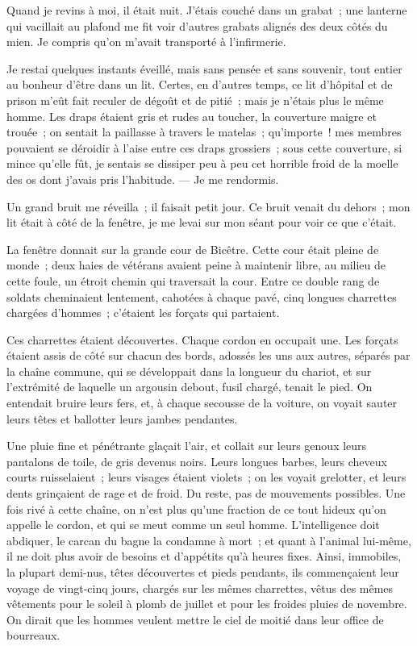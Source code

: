 \documentclass[french,twoside]{book} %
\begin{document}
\noindent Quand je revins à moi, il était nuit. J’étais couché dans un grabat ; une lanterne qui vacillait au plafond me fit voir d’autres grabats alignés des deux côtés du mien. Je compris qu’on m’avait transporté à l’infirmerie.\par
Je restai quelques instants éveillé, mais sans pensée et sans souvenir, tout entier au bonheur d’être dans un lit. Certes, en d’autres temps, ce lit d’hôpital et de prison m’eût fait reculer de dégoût et de pitié ; mais je n’étais plus le même homme. Les draps étaient gris et rudes au toucher, la couverture maigre et trouée ; on sentait la paillasse à travers le matelas ; qu’importe ! mes membres pouvaient se déroidir à l’aise entre ces draps grossiers ; sous cette couverture, si mince qu’elle fût, je sentais se dissiper peu à peu cet horrible froid de la moelle des os dont j’avais pris l’habitude. — Je me rendormis.\par
Un grand bruit me réveilla ; il faisait petit jour. Ce bruit venait du dehors ; mon lit était à côté de la  fenêtre, je me levai sur mon séant pour voir ce que c’était.\par
La fenêtre donnait sur la grande cour de Bicêtre. Cette cour était pleine de monde ; deux haies de vétérans avaient peine à maintenir libre, au milieu de cette foule, un étroit chemin qui traversait la cour. Entre ce double rang de soldats cheminaient lentement, cahotées à chaque pavé, cinq longues charrettes chargées d’hommes ; c’étaient les forçats qui partaient.\par
Ces charrettes étaient découvertes. Chaque cordon en occupait une. Les forçats étaient assis de côté sur chacun des bords, adossés les uns aux autres, séparés par la chaîne commune, qui se développait dans la longueur du chariot, et sur l’extrémité de laquelle un argousin debout, fusil chargé, tenait le pied. On entendait bruire leurs fers, et, à chaque secousse de la voiture, on voyait sauter leurs têtes et ballotter leurs jambes pendantes.\par
Une pluie fine et pénétrante glaçait l’air, et collait sur leurs genoux leurs pantalons de toile, de gris devenus noirs. Leurs longues barbes, leurs cheveux courts ruisselaient ; leurs visages étaient violets ; on les voyait grelotter, et leurs dents grinçaient de rage et de froid. Du reste, pas de mouvements possibles. Une fois rivé à cette chaîne, on n’est plus qu’une fraction de ce tout hideux qu’on appelle le cordon, et qui se meut comme un seul homme. L’intelligence doit abdiquer, le carcan du bagne la condamne à mort ; et quant à l’animal lui-même, il ne doit plus avoir de besoins et d’appétits qu’à heures fixes. Ainsi, immobiles,  la plupart demi-nus, têtes découvertes et pieds pendants, ils commençaient leur voyage de vingt-cinq jours, chargés sur les mêmes charrettes, vêtus des mêmes vêtements pour le soleil à plomb de juillet et pour les froides pluies de novembre. On dirait que les hommes veulent mettre le ciel de moitié dans leur office de bourreaux.\par
\end{document}
